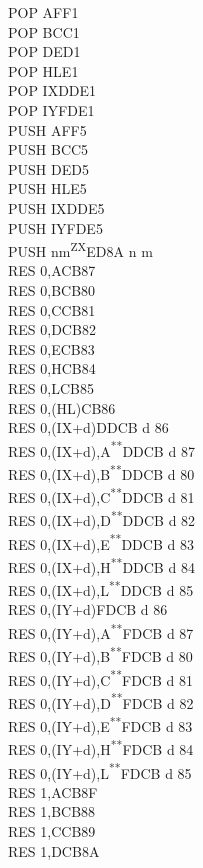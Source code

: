 \documentclass[12pt,twoside,openright,a4paper]{book}
\newcommand{\UNDOC}{\textnormal{\textsuperscript{**}}}
\newcommand{\ZXN}{\textnormal{\textsuperscript{ZX}}}
\begin{document}
\begin{multicols}{3}
{\begin{tabbing}
		POP AF\>F1\\
		POP BC\>C1\\
		POP DE\>D1\\
		POP HL\>E1\\
		POP IX\>DDE1\\
		POP IY\>FDE1\\
		PUSH AF\>F5\\
		PUSH BC\>C5\\
		PUSH DE\>D5\\
		PUSH HL\>E5\\
		PUSH IX\>DDE5\\
		PUSH IY\>FDE5\\
		PUSH nm\ZXN\>ED8A n m\\
		RES 0,A\>CB87\\
		RES 0,B\>CB80\\
		RES 0,C\>CB81\\
		RES 0,D\>CB82\\
		RES 0,E\>CB83\\
		RES 0,H\>CB84\\
		RES 0,L\>CB85\\
		RES 0,(HL)\>CB86\\
		RES 0,(IX+d)\>DDCB d 86\\
		RES 0,(IX+d),A\UNDOC\>DDCB d 87\\
		RES 0,(IX+d),B\UNDOC\>DDCB d 80\\
		RES 0,(IX+d),C\UNDOC\>DDCB d 81\\
		RES 0,(IX+d),D\UNDOC\>DDCB d 82\\
		RES 0,(IX+d),E\UNDOC\>DDCB d 83\\
		RES 0,(IX+d),H\UNDOC\>DDCB d 84\\
		RES 0,(IX+d),L\UNDOC\>DDCB d 85\\
		RES 0,(IY+d)\>FDCB d 86\\
		RES 0,(IY+d),A\UNDOC\>FDCB d 87\\
		RES 0,(IY+d),B\UNDOC\>FDCB d 80\\
		RES 0,(IY+d),C\UNDOC\>FDCB d 81\\
		RES 0,(IY+d),D\UNDOC\>FDCB d 82\\
		RES 0,(IY+d),E\UNDOC\>FDCB d 83\\
		RES 0,(IY+d),H\UNDOC\>FDCB d 84\\
		RES 0,(IY+d),L\UNDOC\>FDCB d 85\\
		RES 1,A\>CB8F\\
		RES 1,B\>CB88\\
		RES 1,C\>CB89\\
		RES 1,D\>CB8A\\

\end{tabbing}}
\end{multicols}
\end{document}
